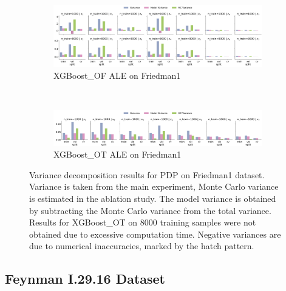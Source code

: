 \documentclass[runningheads]{llncs}
\begin{document}
\begin{figure}[htbp]
    \centering
    \begin{subfigure}[b]{\textwidth}
        \includegraphics[width=\textwidth]{img/Friedman1-all/variance_decomposition_ale_XGBoost_OF.png}
        \caption{XGBoost\_OF ALE on Friedman1}
    \end{subfigure}
    \\[10pt]
    \vfill
    \begin{subfigure}[b]{\textwidth}
        \includegraphics[width=\textwidth]{img/Friedman1-all/variance_decomposition_ale_XGBoost_OT.png}
        \caption{XGBoost\_OT ALE on Friedman1}
    \end{subfigure}
    \caption{Variance decomposition results for PDP on Friedman1 dataset. Variance is taken from the
        main experiment, Monte Carlo variance is estimated in the ablation study. The model variance is
        obtained by subtracting the Monte Carlo variance from the total variance. Results for XGBoost\_OT
        on 8000 training samples were not obtained due to excessive computation time. Negative variances are
        due to numerical inaccuracies, marked by the hatch pattern.}
    \label{fig:ale-variance-decomp-friedman1}  %
\end{figure}

\clearpage
\subsection{Feynman I.29.16 Dataset}
\end{document}
